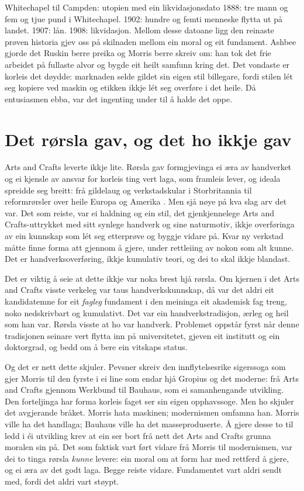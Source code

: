 \begin{kasus}{Whitechapel til Campden: utopien med ein likvidasjonsdato}
1888: tre mann og fem og tjue pund i Whitechapel. 1902: hundre og femti menneske flytta ut på landet. 1907: lån. 1908: likvidasjon. Mellom desse datoane ligg den reinaste prøven historia gjev oss på skilnaden mellom ein moral og eit fundament. Ashbee gjorde det Ruskin berre preika og Morris berre skreiv om: han tok det frie arbeidet på fullaste alvor og bygde eit heilt samfunn kring det. Det vondaste er korleis det døydde: marknaden selde gildet sin eigen stil billegare, fordi stilen lét seg kopiere ved maskin og etikken ikkje lét seg overføre i det heile. Då entusiasmen ebba, var det ingenting under til å halde det oppe.
\end{kasus}

\section{Det rørsla gav, og det ho ikkje gav}

Arts and Crafts leverte ikkje lite. Rørsla gav formgjevinga ei æra av handverket og ei kjensle av ansvar for korleis ting vert laga, som framleis lever, og ideala spreidde seg breitt: frå gildelaug og verkstadskular i Storbritannia til reformrørsler over heile Europa og Amerika \autocite{naylor1971}. Men sjå nøye på kva slag arv det var. Det som reiste, var ei haldning og ein stil, det gjenkjennelege Arts and Crafts-uttrykket med sitt synlege handverk og sine naturmotiv, ikkje overføringa av ein kunnskap som lét seg etterprøve og byggje vidare på. Kvar ny verkstad måtte finne forma att gjennom å gjere, under rettleiing av nokon som alt kunne. Det er handverksoverføring, ikkje kumulativ teori, og dei to skal ikkje blandast.

Det er viktig å seie at dette ikkje var noka brest hjå rørsla. Om kjernen i det Arts and Crafts visste verkeleg var taus handverkskunnskap, då var det aldri eit kandidatemne for eit \emph{fagleg} fundament i den meininga eit akademisk fag treng, noko nedskrivbart og kumulativt. Det var ein handverkstradisjon, ærleg og heil som han var. Rørsla visste at ho var handverk. Problemet oppstår fyrst når denne tradisjonen seinare vert flytta inn på universitetet, gjeven eit institutt og ein doktorgrad, og bedd om å bere ein vitskaps status.

Og det er nett dette \textcite{pevsner1936} skjuler. Pevsner skreiv den innflytelsesrike sigerssoga som gjer Morris til den fyrste i ei line som endar hjå Gropius og det moderne: frå Arts and Crafts gjennom Werkbund til Bauhaus, som ei samanhengande utvikling. Den forteljinga har forma korleis faget ser sin eigen opphavssoge. Men ho skjuler det avgjerande bråket. Morris hata maskinen; modernismen omfamna han. Morris ville ha det handlaga; Bauhaus ville ha det masseproduserte. Å gjere desse to til ledd i éi utvikling krev at ein ser bort frå nett det Arts and Crafts grunna moralen sin på. Det som faktisk vart ført vidare frå Morris til modernismen, var dei to tinga rørsla \emph{kunne} levere: ein moral om at form har med rettferd å gjere, og ei æra av det godt laga. Begge reiste vidare. Fundamentet vart aldri sendt med, fordi det aldri vart støypt.

